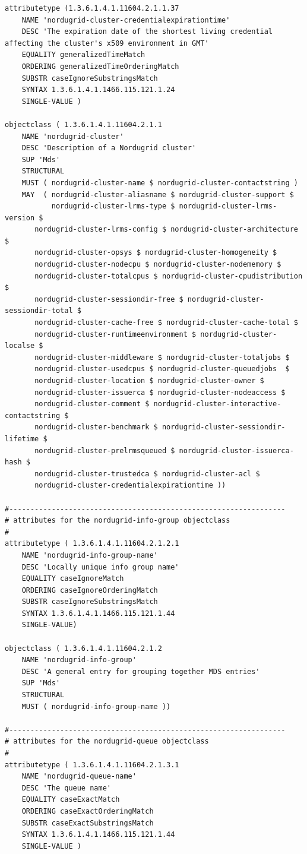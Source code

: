 \documentclass{article}
\begin{document}
\begin{verbatim}
attributetype (1.3.6.1.4.1.11604.2.1.1.37
    NAME 'nordugrid-cluster-credentialexpirationtime'
    DESC 'The expiration date of the shortest living credential affecting the cluster's x509 environment in GMT'
    EQUALITY generalizedTimeMatch
    ORDERING generalizedTimeOrderingMatch
    SUBSTR caseIgnoreSubstringsMatch
    SYNTAX 1.3.6.1.4.1.1466.115.121.1.24
    SINGLE-VALUE )

objectclass ( 1.3.6.1.4.1.11604.2.1.1
    NAME 'nordugrid-cluster'
    DESC 'Description of a Nordugrid cluster'
    SUP 'Mds'
    STRUCTURAL
    MUST ( nordugrid-cluster-name $ nordugrid-cluster-contactstring )
    MAY  ( nordugrid-cluster-aliasname $ nordugrid-cluster-support $
           nordugrid-cluster-lrms-type $ nordugrid-cluster-lrms-version $
	   nordugrid-cluster-lrms-config $ nordugrid-cluster-architecture $
	   nordugrid-cluster-opsys $ nordugrid-cluster-homogeneity $
	   nordugrid-cluster-nodecpu $ nordugrid-cluster-nodememory $
	   nordugrid-cluster-totalcpus $ nordugrid-cluster-cpudistribution $
	   nordugrid-cluster-sessiondir-free $ nordugrid-cluster-sessiondir-total $
	   nordugrid-cluster-cache-free $ nordugrid-cluster-cache-total $
	   nordugrid-cluster-runtimeenvironment $ nordugrid-cluster-localse $
	   nordugrid-cluster-middleware $ nordugrid-cluster-totaljobs $
	   nordugrid-cluster-usedcpus $	nordugrid-cluster-queuedjobs  $
	   nordugrid-cluster-location $ nordugrid-cluster-owner $ 
	   nordugrid-cluster-issuerca $ nordugrid-cluster-nodeaccess $
	   nordugrid-cluster-comment $ nordugrid-cluster-interactive-contactstring $
	   nordugrid-cluster-benchmark $ nordugrid-cluster-sessiondir-lifetime $
	   nordugrid-cluster-prelrmsqueued $ nordugrid-cluster-issuerca-hash $
	   nordugrid-cluster-trustedca $ nordugrid-cluster-acl $
	   nordugrid-cluster-credentialexpirationtime ))

#-----------------------------------------------------------------
# attributes for the nordugrid-info-group objectclass
#
attributetype ( 1.3.6.1.4.1.11604.2.1.2.1
    NAME 'nordugrid-info-group-name'
    DESC 'Locally unique info group name'
    EQUALITY caseIgnoreMatch
    ORDERING caseIgnoreOrderingMatch
    SUBSTR caseIgnoreSubstringsMatch
    SYNTAX 1.3.6.1.4.1.1466.115.121.1.44
    SINGLE-VALUE)
    
objectclass ( 1.3.6.1.4.1.11604.2.1.2
    NAME 'nordugrid-info-group'
    DESC 'A general entry for grouping together MDS entries'
    SUP 'Mds'
    STRUCTURAL
    MUST ( nordugrid-info-group-name ))

#-----------------------------------------------------------------
# attributes for the nordugrid-queue objectclass
#
attributetype ( 1.3.6.1.4.1.11604.2.1.3.1
    NAME 'nordugrid-queue-name'
    DESC 'The queue name'
    EQUALITY caseExactMatch
    ORDERING caseExactOrderingMatch
    SUBSTR caseExactSubstringsMatch
    SYNTAX 1.3.6.1.4.1.1466.115.121.1.44
    SINGLE-VALUE )


\end{verbatim}
\end{document}
